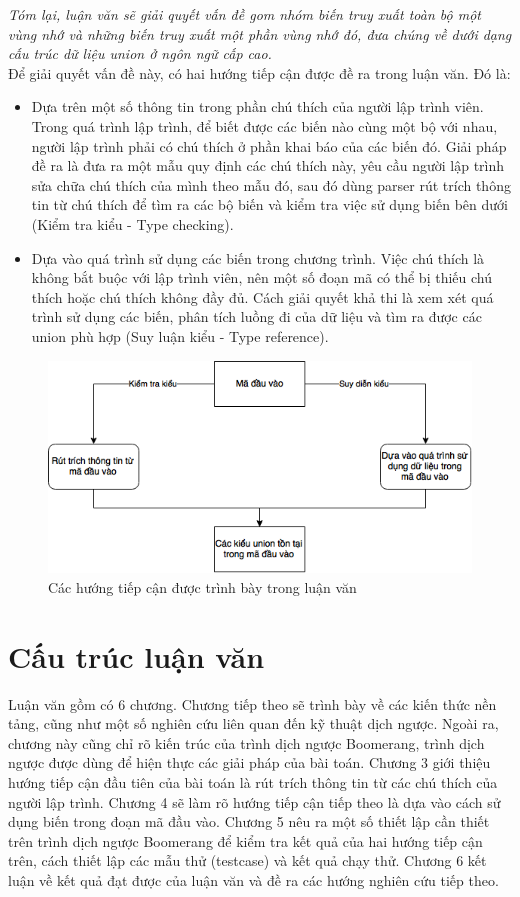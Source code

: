 \textit{Tóm lại, luận văn sẽ giải quyết vấn đề gom nhóm biến truy xuất toàn bộ một vùng nhớ và những biến truy xuất một phần vùng nhớ đó, đưa chúng về dưới dạng cấu trúc dữ liệu union ở ngôn ngữ cấp cao.}\\

Để giải quyết vấn đề này, có hai hướng tiếp cận được đề ra trong luận văn. Đó là:
\begin{itemize}
	\item Dựa trên một số thông tin trong phần chú thích của người lập trình viên. Trong quá trình lập trình, để biết được các biến nào cùng một bộ với nhau, người lập trình phải có chú thích ở phần khai báo của các biến đó. Giải pháp đề ra là đưa ra một mẫu quy định các chú thích này, yêu cầu người lập trình sửa chữa chú thích của mình theo mẫu đó, sau đó dùng parser rút trích thông tin từ chú thích để tìm ra các bộ biến và kiểm tra việc sử dụng biến bên dưới (Kiểm tra kiểu - Type checking).
	\item Dựa vào quá trình sử dụng các biến trong chương trình. Việc chú thích là không bắt buộc với lập trình viên, nên một số đoạn mã có thể bị thiếu chú thích hoặc chú thích không đầy đủ. Cách giải quyết khả thi là xem xét quá trình sử dụng các biến, phân tích luồng đi của dữ liệu và tìm ra được các union phù hợp (Suy luận kiểu - Type reference).
\end{itemize}
\begin{figure}
	\centering
	\includegraphics[width=0.7\linewidth]{image/main}
	\caption{Các hướng tiếp cận được trình bày trong luận văn}
	\label{fig:main}
\end{figure}
\section{Cấu trúc luận văn}

Luận văn gồm có 6 chương. Chương tiếp theo sẽ trình bày về các kiến thức nền tảng, cũng như một số nghiên cứu liên quan đến kỹ thuật dịch ngược. Ngoài ra, chương này cũng chỉ rõ kiến trúc của trình dịch ngược Boomerang, trình dịch ngược được dùng để hiện thực các giải pháp của bài toán. Chương 3 giới thiệu hướng tiếp cận đầu tiên của bài toán là rút trích thông tin từ các chú thích của người lập trình. Chương 4 sẽ làm rõ hướng tiếp cận tiếp theo là dựa vào cách sử dụng biến trong đoạn mã đầu vào. Chương 5 nêu ra một số thiết lập cần thiết trên trình dịch ngược Boomerang để kiểm tra kết quả của hai hướng tiếp cận trên, cách thiết lập các mẫu thử (testcase) và kết quả chạy thử. Chương 6 kết luận về kết quả đạt được của luận văn và đề ra các hướng nghiên cứu tiếp theo.
	
